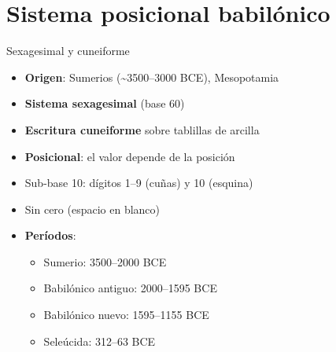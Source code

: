 \documentclass[10pt,xcolor=dvipsnames]{beamer}
\begin{document}
\section{Sistema posicional babilónico}

\begin{frame}{Sexagesimal y cuneiforme}
  \begin{itemize}
    \item \textbf{Origen}: Sumerios (\textasciitilde 3500--3000 BCE), Mesopotamia
    \item \textbf{Sistema sexagesimal} (base 60)
    \item \textbf{Escritura cuneiforme} sobre tablillas de arcilla
    \item \textbf{Posicional}: el valor depende de la posición
    \item Sub-base 10: dígitos 1--9 (cuñas) y 10 (esquina)
    \item Sin cero (espacio en blanco)
    \item \textbf{Períodos}:
      \begin{itemize}
        \item Sumerio: 3500--2000 BCE
        \item Babilónico antiguo: 2000--1595 BCE
        \item Babilónico nuevo: 1595--1155 BCE
        \item Seleúcida: 312--63 BCE
      \end{itemize}
  \end{itemize}
\end{frame}
\end{document}
